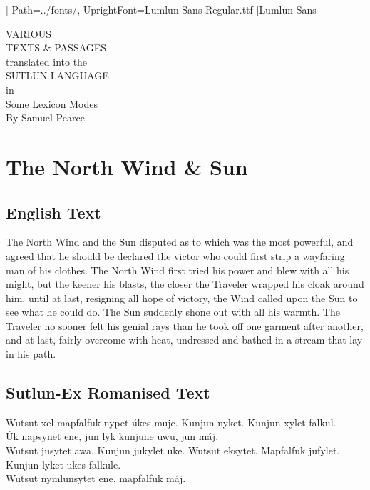 \documentclass{book}
\begin{document}
\newfontfamily{\lmln}[
    Path=../fonts/,
    UprightFont=Lumlun Sans Regular.ttf
]{Lumlun Sans}

\newcommand{\ortho}[1]{{\lmln\Large{\raggedright#1}\par}}

\begingroup
\centering
\vfill
\Huge{VARIOUS}\\
\Huge{TEXTS \& PASSAGES}\\
\huge{translated into the}\\
\huge{SUTLUN LANGUAGE}\\
\large{in}\\
\Large{Some Lexicon Modes}\\
\vspace{3cm}
\Large{By Samuel Pearce}\\
\vfill\null
\endgroup
\thispagestyle{empty}

\tableofcontents
\pagebreak

\chapter{}

\chapter{The North Wind \& Sun}
\section{English Text}

    The North Wind and the Sun disputed as to which was the most powerful,
    and agreed that he should be declared the victor who could first strip a wayfaring man of his clothes.
    The North Wind first tried his power and blew with all his might, but the keener his blasts,
    the closer the Traveler wrapped his cloak around him, until at last, resigning all hope of victory,
    the Wind called upon the Sun to see what he could do. The Sun suddenly shone out with all his warmth.
    The Traveler no sooner felt his genial rays than he took off one garment after another, and at last,
    fairly overcome with heat, undressed and bathed in a stream that lay in his path.

\section{Sutlun-Ex Romanised Text}

    Wutsut xel mapfalfuk nypet úkes muje. Kunjun nyket. Kunjun xylet falkul.\\
    Úk napsynet ene, jun lyk kunjune uwu, jun máj.\\
    Wutsut jusytet awa, Kunjun jukylet uke. Wutsut eksytet.
    Mapfalfuk jufylet. Kunjun lyket ukes falkule.\\
    Wutsut nymlunsytet ene, mapfalfuk máj.\\
\end{document}
